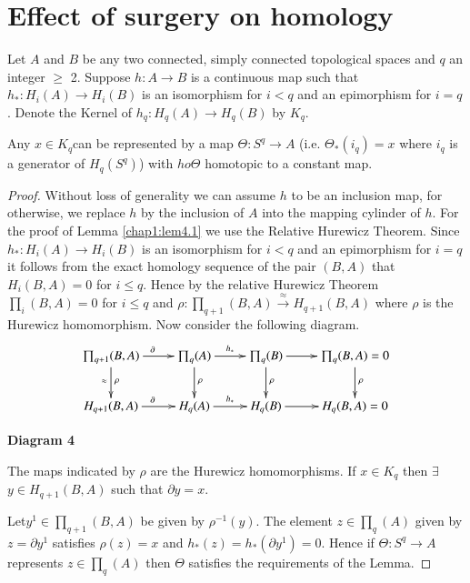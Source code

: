  \section{Effect of surgery on homology}\label{chap1:sec4}%
  Let $A$ and $B$ be any two connected, simply connected topological
 spaces and $q$ an integer $\geq$ 2. Suppose $h: A \rightarrow B$ is a
 continuous map such that $h_*: H_i (A) \rightarrow H_i (B)$ is an
 isomorphism for $i < q$ and an epimorphism for $i = q$. Denote the
 Kernel of $h_q: H_q (A) \rightarrow H_q (B)$ by $K_q$. 
 
 \begin{lemma}\label{chap1:lem4.1}%
 Any $x \in K_q$\pageoriginale can be represented by a map
 $\Theta: S^q \rightarrow A$ (i.e. $\Theta_* (i_q) = x $ where $i_q$
 is a generator of $H_q(S^q)$) with $h o \Theta$ homotopic to a
 constant map.  
 \end{lemma} 
 
 \begin{proof}%
Without loss of generality we can assume $h$ to be an inclusion map,
for otherwise, we replace $h$ by the inclusion of $A$ into the mapping
cylinder of $h$. For the proof of Lemma \ref{chap1:lem4.1} we use the Relative
Hurewicz Theorem. Since $h_* : H_i (A) \rightarrow H_i(B)$ is an
isomorphism for $i<q$ and an epimorphism for $i = q$ it follows from
the exact homology sequence of the pair $(B, A)$ that $H_i (B, A) = 0$
for $i \leq q$. Hence by the relative Hurewicz Theorem $\prod_i (B, A)
= 0$ for $i \leq q$ and $\rho: \prod_{q+1}(B, A)\xrightarrow{\approx}
H_{q+1}(B, A)$ where $\rho$ is the Hurewicz homomorphism. Now consider
the following diagram.  
\[
\xymatrix{
\prod_{q+1} (B,A) \ar[r]^\partial \ar[d]^\rho_{\approx} & \prod_q (A)
\ar[r]^{h_*} \ar[d]^\rho & \prod_q (B) \ar[r] \ar[d]^\rho &
\prod_q(B,A) = 0 \ar[d]^\rho\\
H_{q+1} (B,A) \ar[r]^\partial & H_q (A) \ar[r]^{h_*} & H_q (B) \ar[r] &
H_q (B,A) =0
 }
\] 
\begin{center}
{\bf Diagram 4}
\end{center}

The maps indicated by $\rho$ are the Hurewicz homomorphisms. If
$x\in K_q$ then $\exists$ $y \in H_{q+1}(B, A)$ such that
$\partial y = x$. 

Let\pageoriginale $y^1 \in \prod_{q+1} (B, A)$ be given by
$\rho^{-1}(y)$. The 
element $z\in \prod_q (A)$ given by $z = \partial y^1$ satisfies
$\rho(z) = x$ and $h_* (z) = h_* (\partial y^1) = 0$. Hence if $
\Theta: S^q \rightarrow A$ represents $z\in \prod_q (A)$ then
$\Theta$ satisfies the requirements of the Lemma.  
 \end{proof}

